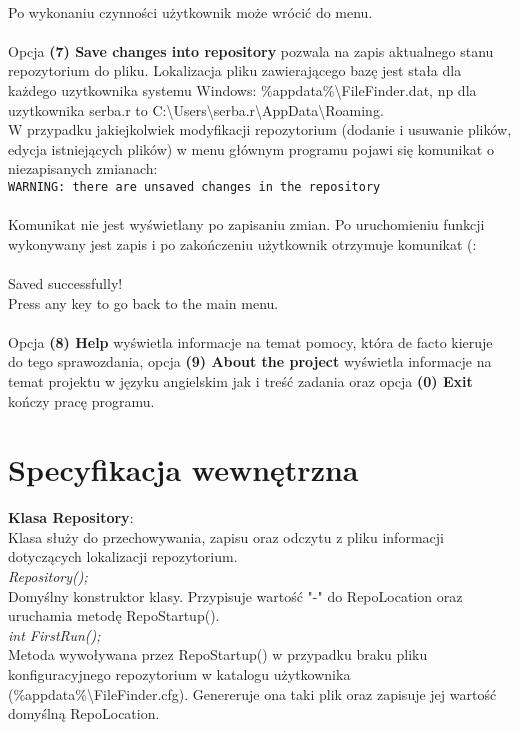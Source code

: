 \documentclass[10pt, a4paper]{article}
\begin{document}
\\
Po wykonaniu czynności użytkownik może wrócić do menu.\\
\\
Opcja \textbf{(7) Save changes into repository} pozwala na zapis aktualnego stanu repozytorium do pliku. Lokalizacja pliku zawierającego bazę jest stała dla każdego uzytkownika systemu Windows: \%appdata\%\textbackslash FileFinder.dat, np dla uzytkownika serba.r to C:\textbackslash Users\textbackslash serba.r\textbackslash AppData\textbackslash Roaming.\\
W przypadku jakiejkolwiek modyfikacji repozytorium (dodanie i usuwanie plików, edycja istniejących plików) w menu głównym programu pojawi się komunikat o niezapisanych zmianach:\\

\texttt{WARNING: there are unsaved changes in the repository}\\
\\
Komunikat nie jest wyświetlany po zapisaniu zmian. Po uruchomieniu funkcji wykonywany jest zapis i po zakończeniu użytkownik otrzymuje komunikat (:\\
\\
Saved successfully!\\
Press any key to go back to the main menu.\\
\\
Opcja \textbf{(8) Help} wyświetla informacje na temat pomocy, która de facto kieruje do tego sprawozdania, opcja \textbf{(9) About the project} wyświetla informacje na temat projektu w języku angielskim jak i treść zadania oraz opcja \textbf{(0) Exit} kończy pracę programu.

\section{Specyfikacja wewnętrzna}
\textbf{Klasa Repository}:\\
Klasa służy do przechowywania, zapisu oraz odczytu z pliku informacji dotyczących lokalizacji repozytorium.\\

\textit{Repository();}\\
Domyślny konstruktor klasy. Przypisuje wartość "-" do RepoLocation oraz uruchamia metodę RepoStartup().\\

\textit{int FirstRun();}\\
Metoda wywoływana przez RepoStartup() w przypadku braku pliku konfiguracyjnego repozytorium w katalogu użytkownika (\%appdata\%\textbackslash FileFinder.cfg). Genereruje ona taki plik oraz zapisuje jej wartość domyślną RepoLocation.\\
\end{document}
